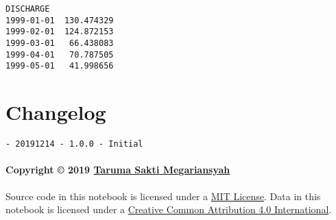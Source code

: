 \documentclass[11pt]{article}
\makeatletter
\newcommand{\boxspacing}{\kern\kvtcb@left@rule\kern\kvtcb@boxsep}
\newcommand{\prompt}[4]{
        {\ttfamily\llap{{\color{#2}[#3]:\hspace{3pt}#4}}\vspace{-\baselineskip}}
    }
\makeatother
\begin{document}
            \begin{tcolorbox}[breakable, size=fbox, boxrule=.5pt, pad at break*=1mm, opacityfill=0]
\prompt{Out}{outcolor}{ }{\boxspacing}
\begin{Verbatim}[commandchars=\\\{\}]
             DISCHARGE
1999-01-01  130.474329
1999-02-01  124.872153
1999-03-01   66.438083
1999-04-01   70.787505
1999-05-01   41.998656
\end{Verbatim}
\end{tcolorbox}
        
    \hypertarget{changelog}{%
\section{Changelog}\label{changelog}}

\begin{verbatim}
- 20191214 - 1.0.0 - Initial
\end{verbatim}

\hypertarget{copyright-2019-taruma-sakti-megariansyah}{%
\paragraph{\texorpdfstring{Copyright © 2019
\href{https://taruma.github.io}{Taruma Sakti
Megariansyah}}{Copyright © 2019 Taruma Sakti Megariansyah}}\label{copyright-2019-taruma-sakti-megariansyah}}

Source code in this notebook is licensed under a
\href{https://choosealicense.com/licenses/mit/}{MIT License}. Data in
this notebook is licensed under a
\href{https://creativecommons.org/licenses/by/4.0/}{Creative Common
Attribution 4.0 International}.


    
    
    
\end{document}
